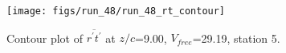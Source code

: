 \begin{figure}[H]
\centering
\texttt{[image: figs/run\_48/run\_48\_rt\_contour]}
\caption{Contour plot of $\overline{r^\prime t^\prime}$ at $z/c$=9.00, $V_{free}$=29.19, station 5.}
\label{fig:run_48_rt_contour}
\end{figure}


